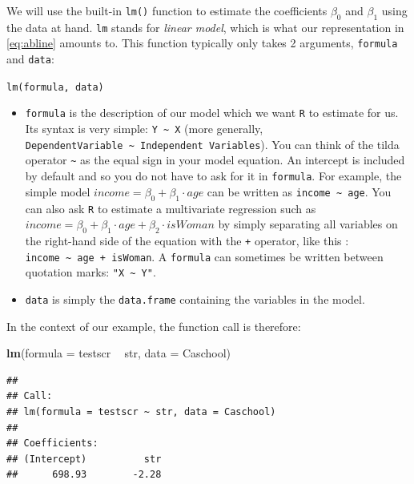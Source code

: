 \documentclass[]{book}
\newenvironment{Shaded}{\begin{snugshade}}{\end{snugshade}}
\newcommand{\KeywordTok}[1]{\textcolor[rgb]{0.13,0.29,0.53}{\textbf{#1}}}
\newcommand{\DataTypeTok}[1]{\textcolor[rgb]{0.13,0.29,0.53}{#1}}
\newcommand{\StringTok}[1]{\textcolor[rgb]{0.31,0.60,0.02}{#1}}
\newcommand{\OperatorTok}[1]{\textcolor[rgb]{0.81,0.36,0.00}{\textbf{#1}}}
\newcommand{\NormalTok}[1]{#1}
\theoremstyle{definition}
\theoremstyle{definition}
\theoremstyle{definition}
\theoremstyle{remark}
\begin{document}
We will use the built-in \texttt{lm()} function to estimate the
coefficients \(\beta_0\) and \(\beta_1\) using the data at hand.
\texttt{lm} stands for \emph{linear model}, which is what our
representation in \eqref{eq:abline} amounts to. This function typically
only takes 2 arguments, \texttt{formula} and \texttt{data}:

\texttt{lm(formula,\ data)}

\begin{itemize}
\item
  \texttt{formula} is the description of our model which we want
  \texttt{R} to estimate for us. Its syntax is very simple:
  \texttt{Y\ \textasciitilde{}\ X} (more generally,
  \texttt{DependentVariable\ \textasciitilde{}\ Independent\ Variables}).
  You can think of the tilda operator \texttt{\textasciitilde{}} as the
  equal sign in your model equation. An intercept is included by default
  and so you do not have to ask for it in \texttt{formula}. For example,
  the simple model \(income = \beta_0 + \beta_1 \cdot age\) can be
  written as \texttt{income\ \textasciitilde{}\ age}. You can also ask
  \texttt{R} to estimate a multivariate regression such as
  \(income = \beta_0 + \beta_1 \cdot age + \beta_2 \cdot isWoman\) by
  simply separating all variables on the right-hand side of the equation
  with the \texttt{+} operator, like this :
  \texttt{income\ \textasciitilde{}\ age\ +\ isWoman}. A
  \texttt{formula} can sometimes be written between quotation marks:
  \texttt{"X\ \textasciitilde{}\ Y"}.
\item
  \texttt{data} is simply the \texttt{data.frame} containing the
  variables in the model.
\end{itemize}

In the context of our example, the function call is therefore:

\begin{Shaded}
\begin{Highlighting}[]
\KeywordTok{lm}\NormalTok{(}\DataTypeTok{formula =}\NormalTok{ testscr }\OperatorTok{~}\StringTok{ }\NormalTok{str, }\DataTypeTok{data =}\NormalTok{ Caschool)}
\end{Highlighting}
\end{Shaded}

\begin{verbatim}
## 
## Call:
## lm(formula = testscr ~ str, data = Caschool)
## 
## Coefficients:
## (Intercept)          str  
##      698.93        -2.28
\end{verbatim}
\end{document}
